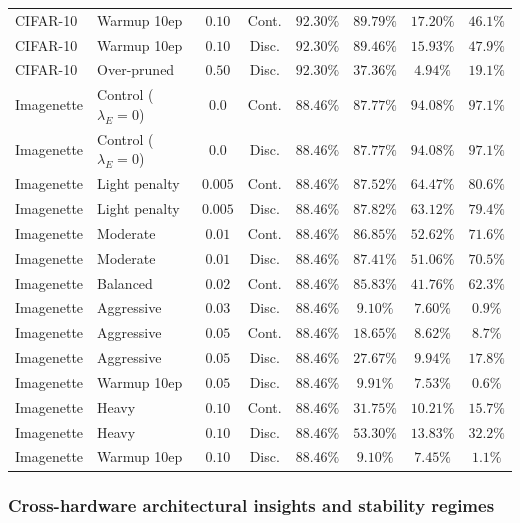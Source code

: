 \begin{table}[htbp]
{\begin{tabular}{llcccccc}
CIFAR-10 & Warmup 10ep & $0.10$ & Cont. & $92.30\%$ & $89.79\%$ & $17.20\%$ & $46.1\%$ \\
CIFAR-10 & Warmup 10ep & $0.10$ & Disc. & $92.30\%$ & $89.46\%$ & $15.93\%$ & $47.9\%$ \\
CIFAR-10 & Over-pruned & $0.50$ & Disc. & $92.30\%$ & $\mathbf{37.36\%}$ & $4.94\%$ & $19.1\%$ \\
\midrule
Imagenette & Control ($\lambda_E=0$) & $0.0$ & Cont. & $88.46\%$ & $87.77\%$ & $94.08\%$ & $97.1\%$ \\
Imagenette & Control ($\lambda_E=0$) & $0.0$ & Disc. & $88.46\%$ & $87.77\%$ & $94.08\%$ & $97.1\%$ \\
Imagenette & Light penalty & $0.005$ & Cont. & $88.46\%$ & $87.52\%$ & $64.47\%$ & $80.6\%$ \\
Imagenette & Light penalty & $0.005$ & Disc. & $88.46\%$ & $87.82\%$ & $63.12\%$ & $79.4\%$ \\
Imagenette & Moderate & $0.01$ & Cont. & $88.46\%$ & $86.85\%$ & $52.62\%$ & $71.6\%$ \\
Imagenette & Moderate & $0.01$ & Disc. & $88.46\%$ & $87.41\%$ & $51.06\%$ & $70.5\%$ \\
Imagenette & Balanced & $0.02$ & Cont. & $88.46\%$ & $85.83\%$ & $41.76\%$ & $62.3\%$ \\
Imagenette & Aggressive & $0.03$ & Disc. & $88.46\%$ & $\mathbf{9.10\%}$ & $7.60\%$ & $0.9\%$ \\
Imagenette & Aggressive & $0.05$ & Cont. & $88.46\%$ & $\mathbf{18.65\%}$ & $8.62\%$ & $8.7\%$ \\
Imagenette & Aggressive & $0.05$ & Disc. & $88.46\%$ & $\mathbf{27.67\%}$ & $9.94\%$ & $17.8\%$ \\
Imagenette & Warmup 10ep & $0.05$ & Disc. & $88.46\%$ & $\mathbf{9.91\%}$ & $7.53\%$ & $0.6\%$ \\
Imagenette & Heavy & $0.10$ & Cont. & $88.46\%$ & $\mathbf{31.75\%}$ & $10.21\%$ & $15.7\%$ \\
Imagenette & Heavy & $0.10$ & Disc. & $88.46\%$ & $\mathbf{53.30\%}$ & $13.83\%$ & $32.2\%$ \\
Imagenette & Warmup 10ep & $0.10$ & Disc. & $88.46\%$ & $\mathbf{9.10\%}$ & $7.45\%$ & $1.1\%$ \\
\bottomrule
\end{tabular}%
}
\end{table}

\subsubsection{Cross-hardware architectural insights and stability regimes}

